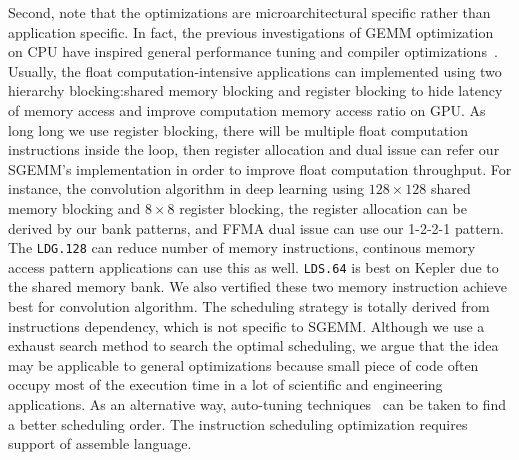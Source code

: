 Second, note that the optimizations are microarchitectural specific rather than application specific. In fact, the previous investigations of GEMM optimization on CPU have inspired general performance tuning and compiler optimizations~\cite{lam1991cache}.  
Usually, the float computation-intensive applications can implemented using two hierarchy blocking:shared memory blocking and register blocking to hide latency of memory access and improve computation memory access ratio on GPU. As long long we use register blocking, there will be multiple float computation instructions inside the loop, then register allocation  and dual issue can refer our SGEMM's implementation in order to improve float computation throughput. For instance, the convolution algorithm in deep learning using $128\times128$ shared memory blocking and $8\times8$ register blocking, the register allocation can be derived by our bank patterns, and FFMA dual issue can use our 1-2-2-1 pattern. The {\tt LDG.128} can reduce number of memory instructions, continous memory access pattern applications can use this as well.
{\tt LDS.64} is best on Kepler due to the shared memory bank. We also vertified these two memory instruction achieve best for convolution algorithm.
The scheduling strategy is totally derived from instructions dependency,
which is not specific to SGEMM. Although we use a exhaust search method to search the optimal scheduling, we
argue that the idea may be applicable to general optimizations
because small piece of code often occupy most of the
execution time in a lot of scientific and engineering applications.
As an alternative way, auto-tuning techniques~\cite{} 
can be taken to find a better scheduling order. The instruction
scheduling optimization requires support of assemble language.




